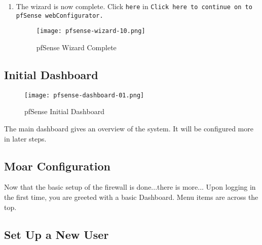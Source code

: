 \begin{enumerate}
 \item The wizard is now complete. Click \texttt{here} in \texttt{Click here to continue on to pfSense webConfigurator.}
\begin{figure}[h!]
\begin{center}
\texttt{[image: pfsense-wizard-10.png]}
 \caption{pfSense Wizard Complete}
 \label{fig:pfsense-wizard-10}
\end{center}
\end{figure}

\end{enumerate}

\subsection{Initial Dashboard}
\begin{figure}[h!]
\begin{center}
\texttt{[image: pfsense-dashboard-01.png]}
 \caption{pfSense Initial Dashboard}
 \label{fig:pfsense-dashboard-01}
\end{center}
\end{figure}

The main dashboard gives an overview of the system. It will be configured more in later steps.


\subsection{Moar Configuration}
Now that the basic setup of the firewall is done...there is more...
Upon logging in the first time, you are greeted with a basic Dashboard. Menu items are across the top.

\subsection{Set Up a New User}


